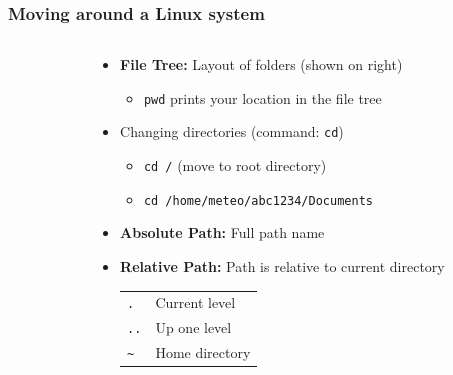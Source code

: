 \documentclass[hyperref,pdfa,unicode,utf8,usepdftitle]{beamer}
\begin{document}
\begin{frame}
  \frametitle{Moving around a Linux system}
  \begin{columns}
    \begin{column}{0.3\textwidth}
    \end{column}
    \begin{column}{0.6\textwidth}
      \begin{itemize}
      \item \textbf{File Tree:} Layout of folders (shown on right)
        \begin{itemize}
        \item \lstinline{pwd} prints your location in the file tree 
        \end{itemize}
      \item Changing directories (command: \lstinline{cd})
        \begin{itemize}
        \item \lstinline{cd /} (move to root directory)
        \item \lstinline{cd /home/meteo/abc1234/Documents}
        \end{itemize}
      \item \textbf{Absolute Path:} Full path name
      \item \textbf{Relative Path:} Path is relative to current
        directory
        \begin{tabular}{ll}
          \texttt{.} & Current level \\
          \texttt{..} & Up one level \\
          \texttt{\~} & Home directory
        \end{tabular}
      \end{itemize}
    \end{column}
  \end{columns}
\end{frame}
\end{document}
